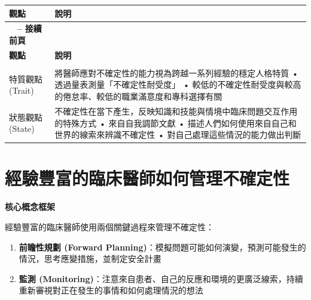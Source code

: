 \documentclass[12pt,a4paper]{article}
\begin{document}
\begin{longtable}{>{\raggedright\arraybackslash}p{4cm} >{\raggedright\arraybackslash}p{11cm}}
\toprule
\textbf{\textcolor{emergency_blue}{觀點}} & \textbf{\textcolor{emergency_blue}{說明}} \\
\midrule
\endfirsthead

\multicolumn{2}{c}%
{{\bfseries \tablename\ \thetable{} -- 接續前頁}} \\
\toprule
\textbf{\textcolor{emergency_blue}{觀點}} & \textbf{\textcolor{emergency_blue}{說明}} \\
\midrule
\endhead

\midrule \multicolumn{2}{r}{{接續下頁}} \\ \midrule
\endfoot

\bottomrule
\endlastfoot

\textcolor{emergency_red}{特質觀點 (Trait)} & 將醫師應對不確定性的能力視為跨越一系列經驗的穩定人格特質 \newline • 透過量表測量「不確定性耐受度」 \newline • 較低的不確定性耐受度與較高的倦怠率、較低的職業滿意度和專科選擇有關 \\

\textcolor{emergency_red}{狀態觀點 (State)} & 不確定性在當下產生，反映知識和技能與情境中臨床問題交互作用的特殊方式 \newline • 來自自我調節文獻 \newline • 描述人們如何使用來自自己和世界的線索來辨識不確定性 \newline • 對自己處理這些情況的能力做出判斷 \\
\end{longtable}

\section{經驗豐富的臨床醫師如何管理不確定性}

\begin{importantbox}
\textbf{核心概念框架}

經驗豐富的臨床醫師使用兩個關鍵過程來管理不確定性：
\begin{enumerate}
\item \textbf{前瞻性規劃 (Forward Planning)}：模擬問題可能如何演變，預測可能發生的情況，思考應變措施，並制定安全計畫
\item \textbf{監測 (Monitoring)}：注意來自患者、自己的反應和環境的更廣泛線索，持續重新審視對正在發生的事情和如何處理情況的想法
\end{enumerate}
\end{importantbox}
\end{document}
